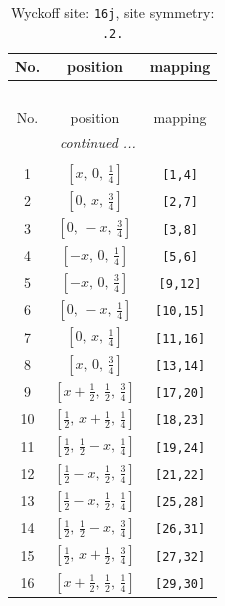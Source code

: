 \documentclass[fleqn,8pt]{jsarticle}
\begin{document}
\renewcommand{\arraystretch}{1.2}
\begin{longtable}{ccc}
\caption{Wyckoff site: {\tt 16j}, site symmetry: {\tt .2.}}
 \\
 \hline \hline
No. & position & mapping \\ \hline \endfirsthead

\multicolumn{2}{l}{\tablename\ \thetable{}} \\
 \hline \hline
No. & position & mapping \\ \hline \endhead

 \hline \hline
\multicolumn{2}{r}{\footnotesize\it continued ...} \\ \endfoot

 \hline \hline
\multicolumn{2}{r}{} \\ \endlastfoot

1 & $\left[ x,\, 0,\, \frac{1}{4} \right]$ & {\tt [1,4]} \\ \hline
2 & $\left[ 0,\, x,\, \frac{3}{4} \right]$ & {\tt [2,7]} \\ \hline
3 & $\left[ 0,\, - x,\, \frac{3}{4} \right]$ & {\tt [3,8]} \\ \hline
4 & $\left[ - x,\, 0,\, \frac{1}{4} \right]$ & {\tt [5,6]} \\ \hline
5 & $\left[ - x,\, 0,\, \frac{3}{4} \right]$ & {\tt [9,12]} \\ \hline
6 & $\left[ 0,\, - x,\, \frac{1}{4} \right]$ & {\tt [10,15]} \\ \hline
7 & $\left[ 0,\, x,\, \frac{1}{4} \right]$ & {\tt [11,16]} \\ \hline
8 & $\left[ x,\, 0,\, \frac{3}{4} \right]$ & {\tt [13,14]} \\ \hline
9 & $\left[ x + \frac{1}{2},\, \frac{1}{2},\, \frac{3}{4} \right]$ & {\tt [17,20]} \\ \hline
10 & $\left[ \frac{1}{2},\, x + \frac{1}{2},\, \frac{1}{4} \right]$ & {\tt [18,23]} \\ \hline
11 & $\left[ \frac{1}{2},\, \frac{1}{2} - x,\, \frac{1}{4} \right]$ & {\tt [19,24]} \\ \hline
12 & $\left[ \frac{1}{2} - x,\, \frac{1}{2},\, \frac{3}{4} \right]$ & {\tt [21,22]} \\ \hline
13 & $\left[ \frac{1}{2} - x,\, \frac{1}{2},\, \frac{1}{4} \right]$ & {\tt [25,28]} \\ \hline
14 & $\left[ \frac{1}{2},\, \frac{1}{2} - x,\, \frac{3}{4} \right]$ & {\tt [26,31]} \\ \hline
15 & $\left[ \frac{1}{2},\, x + \frac{1}{2},\, \frac{3}{4} \right]$ & {\tt [27,32]} \\ \hline
16 & $\left[ x + \frac{1}{2},\, \frac{1}{2},\, \frac{1}{4} \right]$ & {\tt [29,30]} \\
\end{longtable}
\end{document}

